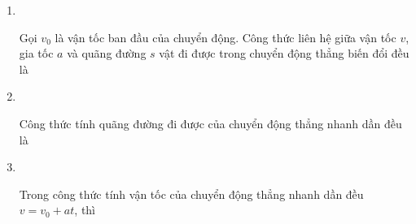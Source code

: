 \begin{enumerate}[label=\bfseries Câu \arabic*:]
\item {}\\
{Gọi $v_0$ là vận tốc ban đầu của chuyển động. Công thức liên hệ giữa vận tốc $v$, gia tốc $a$ và quãng đường $s$ vật đi được trong chuyển động thẳng biến đổi đều là
}
\item {}\\
{Công thức tính quãng đường đi được của chuyển động thẳng nhanh dần đều là
}

\item {}\\
{Trong công thức tính vận tốc của chuyển động thẳng nhanh dần đều $v = v_0 + at$, thì
}


\end{enumerate}
